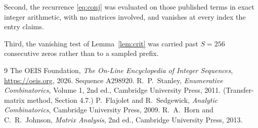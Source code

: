 \documentclass[11pt,a4paper]{article}
\theoremstyle{plain}
\theoremstyle{definition}
\begin{document}
Second, the recurrence \eqref{eq:conj} was evaluated on those published terms in exact
integer arithmetic, with no matrices involved, and vanishes at every index the entry claims.

Third, the vanishing test of Lemma~\ref{lem:crit} was carried past $S=256$ consecutive
zeros rather than to a sampled prefix.

\begin{thebibliography}{9}
 The OEIS Foundation, \emph{The On-Line Encyclopedia of Integer
Sequences}, \url{https://oeis.org}, 2026. Sequence A298920.
 R.~P.~Stanley, \emph{Enumerative Combinatorics}, Volume 1, 2nd ed.,
Cambridge University Press, 2011. (Transfer-matrix method, Section 4.7.)
 P.~Flajolet and R.~Sedgewick, \emph{Analytic Combinatorics}, Cambridge
University Press, 2009.
 R.~A.~Horn and C.~R.~Johnson, \emph{Matrix Analysis}, 2nd ed., Cambridge
University Press, 2013.
\end{thebibliography}
\end{document}
